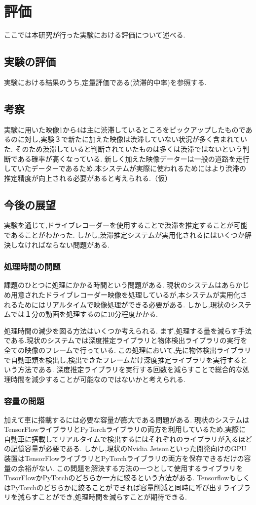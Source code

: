 \chapter{評価}
ここでは本研究が行った実験における評価について述べる.

\section{実験の評価}
実験における結果のうち,定量評価である(渋滞的中率)を参照する.

\section{考察}
実験に用いた映像1から4は主に渋滞しているところをピックアップしたものであるのに対し,実験３で新たに加えた映像は渋滞していない状況が多く含まれていた.
そのため渋滞していると判断されていたものは多くは渋滞ではないという判断である確率が高くなっている.
新しく加えた映像データーは一般の道路を走行していたデーターであるため,本システムが実際に使われるためにはより渋滞の推定精度が向上される必要があると考えられる.（仮）

\section{今後の展望}
実験を通じて,ドライブレコーダーを使用することで渋滞を推定することが可能であることがわかった.
しかし,渋滞推定システムが実用化されるにはいくつか解決しなければならない問題がある.
\subsection{処理時間の問題}
課題のひとつに処理にかかる時間という問題がある.
現状のシステムはあらかじめ用意されたドライブレコーダー映像を処理しているが,本システムが実用化されるためにはリアルタイムで映像処理ができる必要がある.
しかし,現状のシステムでは１分の動画を処理するのに10分程度かかる.

処理時間の減少を図る方法はいくつか考えられる.
まず,処理する量を減らす手法である.現状のシステムでは深度推定ライブラリと物体検出ライブラリの実行を全ての映像のフレームで行っている.
この処理において,先に物体検出ライブラリで自動車類を検出し,検出できたフレームだけ深度推定ライブラリを実行するという方法である.
深度推定ライブラリを実行する回数を減らすことで総合的な処理時間を減少することが可能なのではないかと考えられる.

\subsection{容量の問題}
加えて車に搭載するには必要な容量が膨大である問題がある.
現状のシステムはTensorFlowライブラリとPyTorchライブラリの両方を利用しているため,実際に自動車に搭載してリアルタイムで検出するにはそれぞれのライブラリが入るほどの記憶容量が必要である.
しかし,現状のNvidia Jetsonといった開発向けのGPU装置はTensorFlowライブラリとPyTorchライブラリの両方を保存できるだけの容量の余裕がない.
この問題を解決する方法の一つとして使用するライブラリをTnsorFlowかPyTorchのどちらか一方に絞るという方法がある.
TensorflowもしくはPyTorchのどちらかに絞ることができれば容量削減と同時に呼び出すライブラリを減らすことができ,処理時間を減らすことが期待できる.

